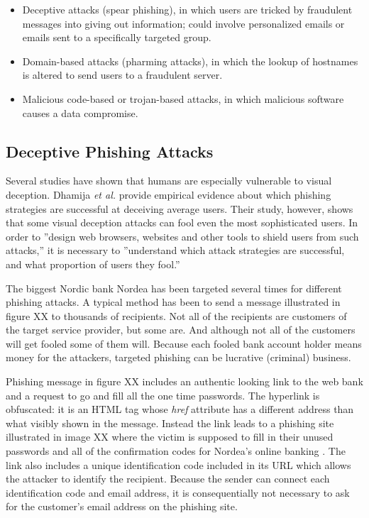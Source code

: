 \documentclass{tktltiki}
\begin{document}
\begin{itemize}

  \item{Deceptive attacks (spear phishing),
            in which users are tricked by fraudulent messages into giving out
            information; could involve personalized emails or emails sent to a specifically 
            targeted group.
          }

  \item{Domain-based attacks (pharming attacks),
            in which the lookup of hostnames is altered to send users to a
            fraudulent server.
          }

  \item{Malicious code-based or trojan-based attacks,
              in which malicious software causes a data compromise.
          }

\end{itemize}


\subsection{Deceptive Phishing Attacks}

    Several studies have shown \cite{visual_similarity_phishing_2008, why_phishing_works_06, suspectibility_to_phishing_2006} that humans are especially vulnerable to visual deception. Dhamija \emph{et al.} \cite{why_phishing_works_06} provide empirical evidence about which phishing strategies are successful at deceiving average users. Their study, however, shows that some visual deception attacks can fool even the most sophisticated users. In order to ''design web browsers, websites and other tools to shield users from such attacks,'' it is necessary to ''understand which attack strategies are successful, and what proportion of users they fool.'' \cite{why_phishing_works_06}

    The biggest Nordic bank Nordea has been targeted several times for different phishing attacks. A typical method has been to send a message illustrated in figure XX to thousands of recipients. Not all of the recipients are customers of the target service provider, but some are. And although not all of the customers will get fooled some of them will. Because each fooled bank account holder means money for the attackers, targeted phishing can be lucrative (criminal) business.

      Phishing message in figure XX includes an authentic looking link to the web bank and a request to go and fill all the one time passwords. The hyperlink is obfuscated: it is an HTML tag whose \emph{href} attribute has a different address than what visibly shown in the message. Instead the link leads to a phishing site illustrated in image XX where the victim is supposed to fill in their unused passwords and all of the confirmation codes for Nordea's online banking \cite{nordea_fsecure_2006, nordea_miller_2006}. The link also includes a unique identification code included in its URL which allows the attacker to identify the recipient. Because the sender can connect each identification code and email address, it is consequentially not necessary to ask for the customer's email address on the phishing site.
      
\end{document}
